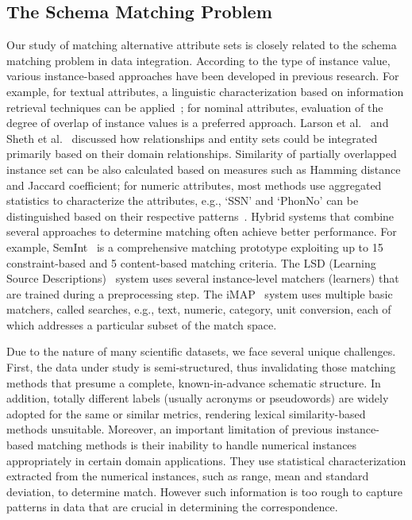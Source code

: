 \subsection{The Schema Matching Problem}
Our study of matching alternative attribute sets is closely related to the schema matching problem in data integration. According to the type of instance value, various instance-based approaches have been developed in previous research. For example, for textual attributes, a linguistic characterization based on information retrieval techniques can be applied~\cite{Rahm01asurvey}; for nominal attributes, evaluation of the degree of overlap of instance values is a preferred approach. Larson et al.~\cite{Larson1989} and Sheth et al.~\cite{Sheth1988} discussed how relationships and entity sets could be integrated primarily based on their domain relationships. Similarity of partially overlapped instance set can be also calculated based on measures such as Hamming distance and Jaccard coefficient; for numeric attributes, most methods use aggregated statistics to characterize the attributes, e.g., `SSN' and `PhonNo' can be distinguished based on their respective patterns~\cite{Rahm01asurvey}. Hybrid systems that combine several approaches to determine matching often achieve better performance. For example, SemInt~\cite{Li00semint:a} is a comprehensive matching prototype exploiting up to 15 constraint-based and 5 content-based matching criteria. The LSD (Learning Source Descriptions)~\cite{Doan2000} system uses several instance-level matchers (learners) that are trained during a preprocessing step. The iMAP~\cite{Dhamankar04imap} system uses multiple basic matchers, called searches, e.g., text, numeric, category, unit conversion, each of which addresses a particular subset of the match space.

Due to the nature of many scientific datasets, we face several unique challenges. First, the data under study is semi-structured, thus invalidating those matching methods that presume a complete, known-in-advance schematic structure. In addition, totally different labels (usually acronyms or pseudowords) are widely adopted for the same or similar metrics, rendering lexical similarity-based methods unsuitable. Moreover, an important limitation of previous instance-based matching methods is their inability to handle numerical instances appropriately in certain domain applications. They use statistical characterization extracted from the numerical instances, such as range, mean and standard deviation, to determine match. However such information is too rough to capture patterns in data that are crucial in determining the correspondence.


